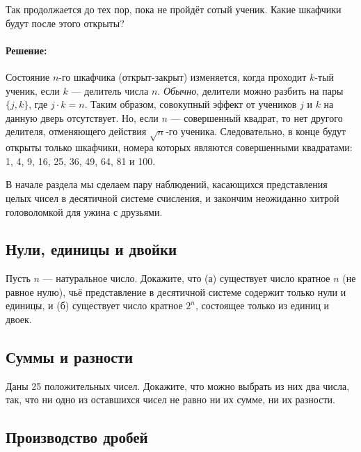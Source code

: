 Так продолжается до тех пор, пока не пройдёт сотый ученик.
Какие шкафчики будут после этого открыты?
 
\paragraph{Решение:}

Состояние $n$-го шкафчика (открыт-закрыт) изменяется, когда проходит $k$-тый ученик, если $k$ --- делитель числа $n$.
\emph{Обычно}, делители можно разбить на пары $\{j,k\}$, где $j\cdot k=n$.
Таким образом, совокупный эффект от учеников $j$ и $k$ на данную дверь отсутствует. %
Но, если $n$ --- совершенный квадрат, то нет другого делителя, отменяющего действия $\sqrt{n}$-го ученика.
Следовательно, в конце будут открыты только шкафчики, номера которых являются совершенными квадратами: 1, 4, 9, 16, 25, 36, 49, 64, 81 и 100.\heart
 
В начале раздела мы сделаем пару наблюдений, касающихся представления целых чисел в десятичной системе счисления, и закончим неожиданно хитрой головоломкой для ужина с друзьями. %

\subsection*{Нули, единицы и двойки}%

Пусть $n$ --- натуральное число.
Докажите, что (а) существует число кратное $n$ (не равное нулю), чьё представление в десятичной системе содержит только нули и единицы, и
(б) существует число кратное $2^n$, состоящее только из единиц и двоек.

\subsection*{Суммы и разности} %

Даны 25 положительных чисел.
Докажите, что можно выбрать из них два числа, так, что ни одно из оставшихся чисел не равно ни их сумме, ни их разности.

\subsection*{Производство дробей}%

